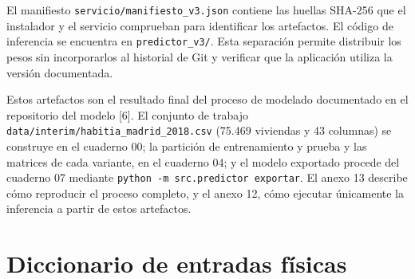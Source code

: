 \documentclass[11pt,a4paper]{article}
\newcounter{anexo}
\begin{document}

\vspace{0.8em}
El manifiesto \texttt{servicio/manifiesto\_v3.json} contiene las huellas SHA-256 que el instalador y el servicio comprueban para identificar los artefactos. El código de inferencia se encuentra en \texttt{predictor\_v3/}. Esta separación permite distribuir los pesos sin incorporarlos al historial de Git y verificar que la aplicación utiliza la versión documentada.

Estos artefactos son el resultado final del proceso de modelado documentado en el repositorio del modelo [6]. El conjunto de trabajo \texttt{data/interim/habitia\_madrid\_2018.csv} (75.469 viviendas y 43 columnas) se construye en el cuaderno 00; la partición de entrenamiento y prueba y las matrices de cada variante, en el cuaderno 04; y el modelo exportado procede del cuaderno 07 mediante \texttt{python -m src.predictor exportar}. El anexo 13 describe cómo reproducir el proceso completo, y el anexo 12, cómo ejecutar únicamente la inferencia a partir de estos artefactos.

\clearpage{}\label{anx:\theanexo}%
\section*{\theanexo\hspace{0.6em}Diccionario de entradas físicas}
\end{document}
